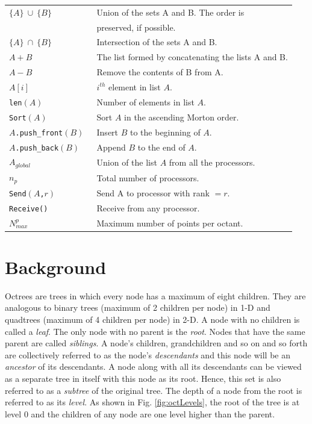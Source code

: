 \begin{table}
\begin{tabular}{|ll|}
    $\{A\} ~ \cup ~ \{B\}$ & Union of the sets A and B. The order is\\
    			 						& preserved, if possible.\\
    $\{A\} ~ \cap ~ \{B\}$ & Intersection of the sets A and B.\\    
    $A + B$ & The list formed by concatenating the lists A and B.\\
    $A - B$ & Remove the contents of B from A.\\
    $A[i]$ & $i^{th}$ element in list $A$.\\
    \tt{len}$(A)$ & Number of elements in list $A$.\\
    \tt{Sort}$(A)$ & Sort $A$ in the ascending Morton order.\\
    $A$\tt{.push\_front}$(B)$ & Insert $B$ to the beginning of $A$.\\
    $A$\tt{.push\_back}$(B)$ & Append $B$ to the end of $A$.\\
    $A_{global}$ & Union of the list $A$ from all the processors.\\
    $n_p$ & Total number of processors.\\
    \tt{Send$\left(A\right.$,$r\left.\right)$ } & Send A to processor with rank $ = r$.\\
    \tt{Receive()} & Receive from any processor.\\
    $N_{max}^p$ & Maximum number of points per octant.\\\hline				
 \end{tabular}	
 \label{tab:Notations}	
 \end{table}



\section{Background}
\label{sec:bg}
Octrees are trees in which every node has a maximum of eight
children. They are analogous to binary trees (maximum of 2 children
per node) in 1-D and quadtrees (maximum of 4 children per node) in
2-D. A node with no children is called a {\em leaf}. The only node
with no parent is the {\em root}. Nodes that have the same parent are
called {\em siblings}. A node's children, grandchildren and so on and
so forth are collectively referred to as the node's {\em descendants}
and this node will be an {\em ancestor} of its descendants. A node
along with all its descendants can be viewed as a separate tree in
itself with this node as its root. Hence, this set is also referred to
as a {\em subtree} of the original tree. The depth of a node from the
root is referred to as its {\em level}. As shown in
Fig. \ref{fig:octLevels}, the root of the tree is at level 0 and the
children of any node are one level higher than the parent.

